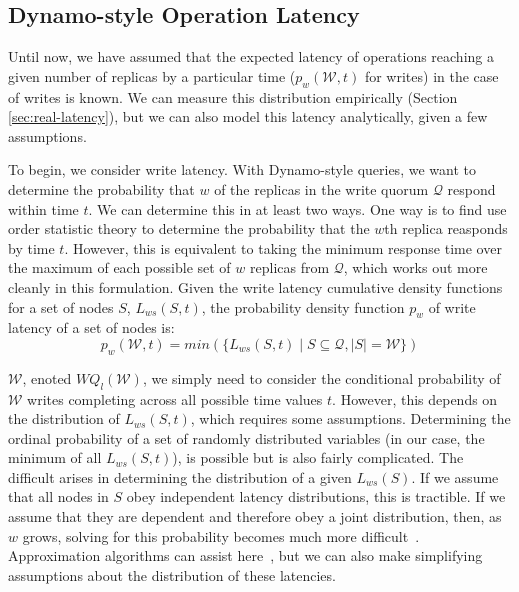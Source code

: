 \documentclass{vldb}
\begin{document}
\subsection{Dynamo-style Operation Latency}

\label{sec:dynamo-prop}

Until now, we have assumed that the expected latency of operations
reaching a given number of replicas by a particular time
($p_w(\mathcal{W}, t)$ for writes) in the case of writes is known.  We
can measure this distribution empirically (Section
\ref{sec:real-latency}), but we can also model this latency
analytically, given a few assumptions.

To begin, we consider write latency.  With Dynamo-style queries, we
want to determine the probability that $w$ of the replicas in the
write quorum $\mathcal{Q}$ respond within time $t$.  We can determine
this in at least two ways.  One way is to find use order statistic
theory to determine the probability that the $w$th replica reasponds
by time $t$.  However, this is equivalent to taking the minimum
response time over the maximum of each possible set of $w$ replicas
from $\mathcal{Q}$, which works out more cleanly in this formulation.
Given the write latency cumulative density functions for a set of
nodes $S$, $L_{ws}(S, t)$, the probability density function $p_w$ of
write latency of a set of nodes is:
\begin{equation}
p_w(\mathcal{W}, t) = min(\{L_{ws}(S, t) \mid S \subseteq \mathcal{Q}, |S| = \mathcal{W}\})
\end{equation}


$\mathcal{W}$, enoted $WQ_l(\mathcal{W})$, we simply need to consider
the conditional probability of $\mathcal{W}$ writes completing across
all possible time values $t$.  However, this depends on the
distribution of $L_{ws}(S, t)$, which requires some
assumptions. Determining the ordinal probability of a set of randomly
distributed variables (in our case, the minimum of all $L_{ws}(S,
t)$), is possible but is also fairly complicated.  The difficult
arises in determining the distribution of a given $L_{ws}(S)$.  If we
assume that all nodes in $S$ obey independent latency distributions,
this is tractible.  If we assume that they are dependent and therefore
obey a joint distribution, then, as $w$ grows, solving for this
probability becomes much more difficult~\cite{needed}.  Approximation
algorithms can assist here~\cite{needed}, but we can also make
simplifying assumptions about the distribution of these latencies.
\end{document}

